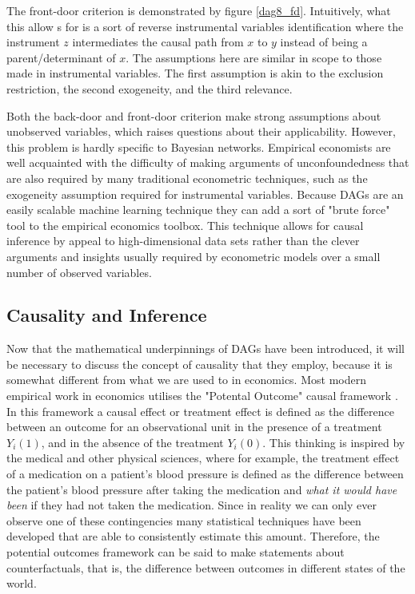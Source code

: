 \documentclass{article}
\begin{document}
The front-door criterion is demonstrated by figure \ref{dag8_fd}. Intuitively, what this allow s for is a sort of reverse instrumental variables identification where the instrument $z$ intermediates the causal path from $x$ to $y$ instead of being a parent/determinant of $x$. The assumptions here are similar in scope to those made in instrumental variables. The first assumption is akin to the exclusion restriction, the second exogeneity, and the third relevance.

Both the back-door and front-door criterion make strong assumptions about unobserved variables, which raises questions about their applicability. However, this problem is hardly specific to Bayesian networks. Empirical economists are well acquainted with the difficulty of making arguments of unconfoundedness that are also required by many traditional econometric techniques, such as the exogeneity assumption required for instrumental variables. Because DAGs are an easily scalable machine learning technique they can add a sort of "brute force" tool to the empirical economics toolbox. This technique allows for causal inference by appeal to high-dimensional data sets rather than the clever arguments and insights usually required by econometric models over a small number of observed variables.

\subsection{Causality and Inference}

Now that the mathematical underpinnings of DAGs have been introduced, it will be necessary to discuss the concept of causality that they employ, because it is somewhat different from what we are used to in economics. Most modern empirical work in economics utilises the "Potental Outcome" causal framework \parencite{holland1986statistics}. In this framework a causal effect or treatment effect is defined as the difference between an outcome for an observational unit in the presence of a treatment $Y_i(1)$, and in the absence of the treatment $Y_i(0)$. This thinking is inspired by the medical and other physical sciences, where for example, the treatment effect of a medication on a patient's blood pressure is defined as the difference between the patient's blood pressure after taking the medication and \textit{what it would have been} if they had not taken the medication. Since in reality we can only ever observe one of these contingencies many statistical techniques have been developed that are able to consistently estimate this amount. Therefore, the potential outcomes framework can be said to make statements about counterfactuals, that is, the difference between outcomes in different states of the world.
\end{document}
